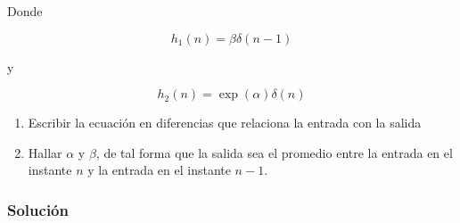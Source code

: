 \documentclass[a4paper,12pt,final]{article}
\begin{document}
    \noindent Donde

    $$h_1\left(n\right) = \beta\delta\left(n-1\right)$$

    \noindent y

    $$h_2\left(n\right) = \exp\left(\alpha\right)\delta\left(n\right)$$

    \begin{enumerate}[label=\alph*)]
      \item Escribir la ecuación en diferencias que relaciona la entrada con la salida
      \item Hallar $\alpha$ y $\beta$, de tal forma que la salida sea el promedio entre la entrada en el instante $n$ y
      la entrada en el instante $n-1$.
    \end{enumerate}

    \subsubsection*{Solución}
\end{document}
